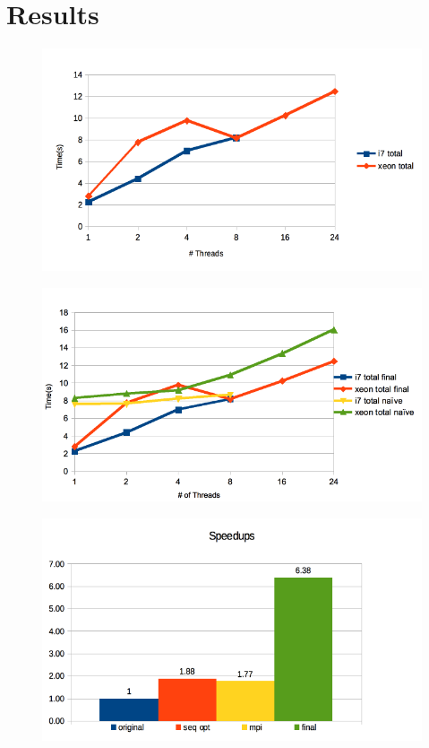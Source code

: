 \documentclass{beamer}
\begin{document}
\section{Results}

\begin{frame}
	\begin{figure}[!htp]
    	\centering   
        \includegraphics[width=.8\textwidth]{../images/time_final.png}        
	\end{figure}
\end{frame}


\begin{frame}
	\begin{figure}[!htp]
    	\centering   
        \includegraphics[width=.8\textwidth]{../images/time_compare2.png}        
	\end{figure}
\end{frame}

\begin{frame}
	\begin{figure}[!htp]
    	\centering   
        \includegraphics[width=.8\textwidth]{../images/time_compared.png}        
	\end{figure}
\end{frame}
\end{document}
